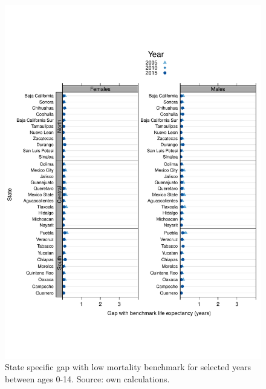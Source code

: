 \documentclass[11.5pt]{article}
\begin{document}
{\begin{figure}
\centering
\caption{State specific gap with low mortality benchmark for selected years between ages 0-14. Source: own calculations.}
\begin{center}
\includegraphics[scale=.8]{Distance_y.pdf}
\end{center}
\end{figure}

}
\end{document}
